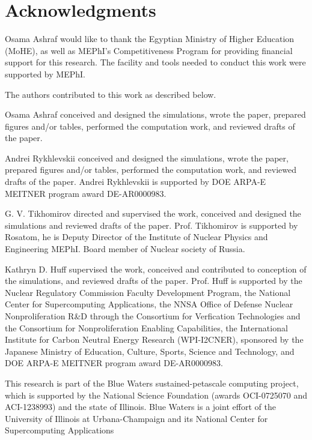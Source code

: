 \section{Acknowledgments}

Osama Ashraf would like to thank the Egyptian Ministry of Higher Education (MoHE), as well as MEPhI's Competitiveness Program for providing financial support for this research. The facility and tools needed to conduct this work were supported by MEPhI.

The authors contributed to this work as described below.

Osama Ashraf conceived and designed the simulations, wrote the paper, prepared figures 
and/or tables, performed the computation work, and reviewed drafts of the paper.

Andrei Rykhlevskii conceived and designed the simulations, wrote the paper, prepared figures 
and/or tables, performed the computation work, and reviewed drafts of the paper. Andrei Rykhlevskii 
is supported by  DOE ARPA-E MEITNER program award DE-AR0000983. 

G. V. Tikhomirov directed and supervised the work, conceived and designed the simulations and reviewed drafts of the paper. Prof. Tikhomirov is supported by Rosatom, he is Deputy Director of the Institute of Nuclear Physics and Engineering MEPhI. Board member of Nuclear society of Russia.

Kathryn D. Huff supervised the work, conceived and contributed to conception of the simulations, and reviewed drafts of the paper.  Prof. Huff is supported by the Nuclear Regulatory Commission Faculty Development Program, the National Center for Supercomputing Applications, the NNSA Office of Defense Nuclear Nonproliferation R\&D through the Consortium for Verfication Technologies and the Consortium for Nonproliferation Enabling Capabilities,  the International Institute for Carbon Neutral Energy Research (WPI-I2CNER), 
sponsored by the Japanese Ministry of Education, Culture, Sports, Science and Technology, and  DOE ARPA-E MEITNER program award DE-AR0000983.

This research is part of the Blue Waters sustained-petascale computing project, 
which is supported by the National Science Foundation (awards OCI-0725070 and 
ACI-1238993) and the state of Illinois. Blue Waters is a joint effort of the 
University of Illinois at Urbana-Champaign and its National Center for 
Supercomputing Applications 
